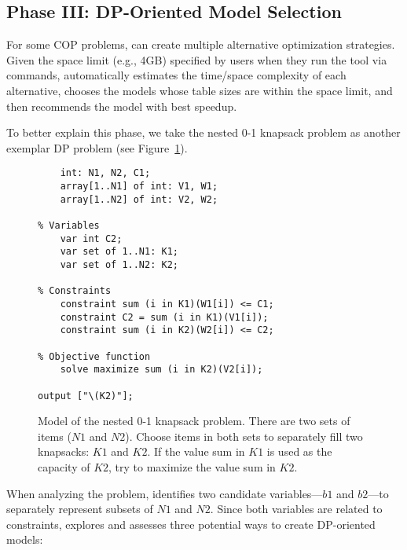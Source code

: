  
 \subsection{Phase III: DP-Oriented Model Selection}
 \label{sec:select}
 
 For some COP problems, \tool can create multiple alternative optimization strategies. Given the space limit (e.g., 4GB) specified by users when they run the tool via commands, \tool automatically estimates the time/space complexity of each alternative, chooses the models whose table sizes are within the space limit, and then recommends the model with best speedup.  
 
To better explain this phase, we take the nested 0-1 knapsack problem as another exemplar DP problem (see Figure~\ref{fig:knapsack3}).  
 	\begin{figure}[htb]
\begin{lstlisting}[frame=single]
% Input arguments
    int: N1, N2, C1;
    array[1..N1] of int: V1, W1;
    array[1..N2] of int: V2, W2;

% Variables
    var int C2;
    var set of 1..N1: K1;
    var set of 1..N2: K2;

% Constraints
    constraint sum (i in K1)(W1[i]) <= C1;
    constraint C2 = sum (i in K1)(V1[i]);
    constraint sum (i in K2)(W2[i]) <= C2;
    
% Objective function
    solve maximize sum (i in K2)(V2[i]);

output ["\(K2)"];
\end{lstlisting}
\caption{Model of the nested 0-1 knapsack problem. There are two sets of items ($N1$ and $N2$).
Choose items in both sets to separately fill two knapsacks: $K1$ and $K2$. If the value sum in $K1$ is used as the capacity of $K2$, try to maximize the value sum in $K2$.}\label{fig:knapsack3}
\end{figure}
When analyzing the problem, \tool identifies two candidate variables---$b1$ and $b2$---to separately represent subsets of $N1$ and $N2$.
Since both variables are related to constraints, \tool explores and assesses three potential ways to create DP-oriented models: 

